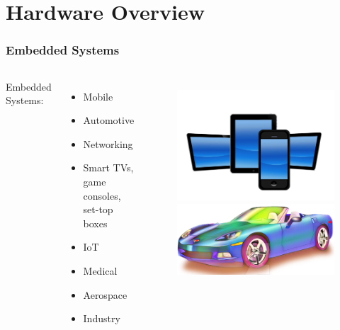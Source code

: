 \documentclass[aspectratio=169]{beamer}
\begin{document}
\section{Hardware Overview}

\begin{frame}
  \frametitle{Embedded Systems}
  \begin{columns}
    Embedded Systems:
     \begin{itemize}
       \item Mobile
       \item Automotive
       \item Networking
       \item Smart TVs, game consoles, set-top boxes
       \item IoT
       \item Medical
       \item Aerospace
       \item Industry
     \end{itemize}
    \begin{figure}
      \includegraphics[scale=0.04]{images/mobile.jpg}
      \includegraphics[scale=0.4]{images/car.png}

\end{figure}
\end{columns}
\end{frame}
\end{document}

